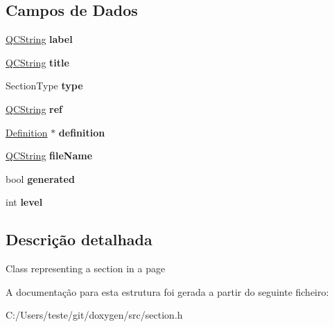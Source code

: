 \subsection*{Campos de Dados}
\begin{DoxyCompactItemize}
\item 
\hypertarget{struct_section_info_ad961cc9bd17b7533dc02fe0826647dc7}{\hyperlink{class_q_c_string}{Q\-C\-String} {\bfseries label}}\label{struct_section_info_ad961cc9bd17b7533dc02fe0826647dc7}

\item 
\hypertarget{struct_section_info_a42bb80709d086df855babb087e63794b}{\hyperlink{class_q_c_string}{Q\-C\-String} {\bfseries title}}\label{struct_section_info_a42bb80709d086df855babb087e63794b}

\item 
\hypertarget{struct_section_info_abd96af88e10d21fc8bc86c8d748643dd}{Section\-Type {\bfseries type}}\label{struct_section_info_abd96af88e10d21fc8bc86c8d748643dd}

\item 
\hypertarget{struct_section_info_a12b5232acab32ee40a197f72270d4ad1}{\hyperlink{class_q_c_string}{Q\-C\-String} {\bfseries ref}}\label{struct_section_info_a12b5232acab32ee40a197f72270d4ad1}

\item 
\hypertarget{struct_section_info_a67ff594cde7defa876364cfbc43c572e}{\hyperlink{class_definition}{Definition} $\ast$ {\bfseries definition}}\label{struct_section_info_a67ff594cde7defa876364cfbc43c572e}

\item 
\hypertarget{struct_section_info_abb9cd3e430c4eaf05aa259fa96f32305}{\hyperlink{class_q_c_string}{Q\-C\-String} {\bfseries file\-Name}}\label{struct_section_info_abb9cd3e430c4eaf05aa259fa96f32305}

\item 
\hypertarget{struct_section_info_a5b0cf19125fc7fc23b12c37aec1a0ff3}{bool {\bfseries generated}}\label{struct_section_info_a5b0cf19125fc7fc23b12c37aec1a0ff3}

\item 
\hypertarget{struct_section_info_acf4d33ee4cff36f69b924471174dcb11}{int {\bfseries level}}\label{struct_section_info_acf4d33ee4cff36f69b924471174dcb11}

\end{DoxyCompactItemize}


\subsection{Descrição detalhada}
Class representing a section in a page 

A documentação para esta estrutura foi gerada a partir do seguinte ficheiro\-:\begin{DoxyCompactItemize}
\item 
C\-:/\-Users/teste/git/doxygen/src/section.\-h\end{DoxyCompactItemize}
